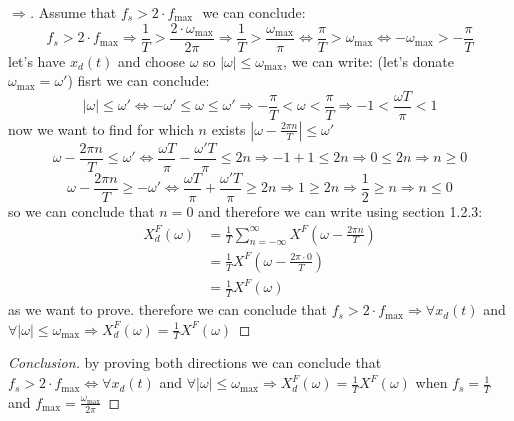 \documentclass{article}
\begin{document}
    \begin{proof}[$\Rightarrow$]
        Assume that $f_s > 2\cdot f_{\max}$
        $ $\newline
        we can conclude:
        \begin{equation}
            f_s > 2\cdot f_{\max} \Rightarrow \frac{1}{T} > \frac{2\cdot \omega_{\max}}{2\pi} \Rightarrow \frac{1}{T} > \frac{\omega_{\max}}{\pi} \iff \frac{\pi}{T} > \omega_{\max} \iff -\omega_{\max} > -\frac{\pi}{T}
        \end{equation}
        let's have $x_d(t)$ and choose $\omega$ so $|\omega|\leq \omega_{\max}$, we can write: (let's donate $\omega_{\max}=\omega'$)
        fisrt we can conclude:
        \begin{equation}
            |\omega| \leq \omega' \iff -\omega' \leq \omega \leq \omega' \Rightarrow -\frac{\pi}{T} < \omega < \frac{\pi}{T}  \Rightarrow -1 < \frac{\omega T}{\pi} < 1
        \end{equation}
        now we want to find for which $n$ exists  $|\omega-\frac{2\pi n}{T}| \leq \omega'$
        \begin{equation}
            \omega -\frac{2\pi n}{T} \leq \omega' \iff  \frac{\omega T}{\pi} - \frac{\omega' T}{\pi} \leq 2n \Rightarrow -1 +1 \leq 2n \Rightarrow 0 \leq 2n \Rightarrow n \geq 0           
        \end{equation}
        \begin{equation}
            \omega -\frac{2\pi n}{T} \geq -\omega' \iff  \frac{\omega T}{\pi} + \frac{\omega' T}{\pi} \geq 2n \Rightarrow 1 \geq 2n \Rightarrow \frac{1}{2} \geq n \Rightarrow n \leq 0
        \end{equation}
        so we can conclude that $n=0$ and therefore we can write using section 1.2.3:
        \begin{equation}
            \begin{aligned}
                X_d^F(\omega) &= \frac{1}{T}\sum^\infty_{n=-\infty}X^F(\omega - \frac{2\pi n}{T})\\
                &= \frac{1}{T}X^F(\omega - \frac{2\pi \cdot 0}{T})\\
                &= \frac{1}{T}X^F(\omega)
            \end{aligned}
        \end{equation}
        as we want to prove.
        therefore we can conclude that $f_s > 2\cdot f_{\max} \Rightarrow \forall x_d(t)$ and $\forall |\omega| \leq \omega_{\max} \Rightarrow X_d^F(\omega) = \frac{1}{T}X^F(\omega)$
        \end{proof}
        \begin{proof}[Conclusion]
            by proving both directions we can conclude that\\ $f_s > 2\cdot f_{\max} \iff \forall x_d(t)$ and $\forall |\omega| \leq \omega_{\max} \Rightarrow X_d^F(\omega) = \frac{1}{T}X^F(\omega)$
            when $f_s= \frac1T$ and $f_{\max} = \frac{\omega_{\max}}{2\pi}$
        \end{proof}
\end{document}
